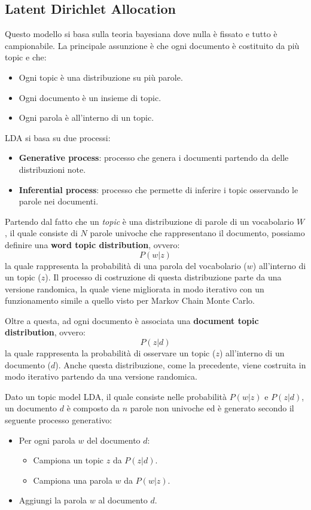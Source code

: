 \subsection{Latent Dirichlet Allocation}
Questo modello si basa sulla teoria bayesiana dove nulla è fissato e tutto è
campionabile. La principale assunzione è che ogni documento è costituito da più
topic e che:
\begin{itemize}
      \item Ogni topic è una distribuzione su più parole.
      \item Ogni documento è un insieme di topic.
      \item Ogni parola è all'interno di un topic.
\end{itemize}
LDA si basa su due processi:
\begin{itemize}
      \item \textbf{Generative process}: processo che genera i documenti partendo
            da delle distribuzioni note.
      \item \textbf{Inferential process}: processo che permette di inferire i topic
            osservando le parole nei documenti.
\end{itemize}
Partendo dal fatto che un \textit{topic} è una distribuzione di parole di un
vocabolario $W$, il quale consiste di $N$ parole univoche che rappresentano il
documento, possiamo definire una \textbf{word topic distribution}, ovvero:
\begin{equation}
      P(w|z)
\end{equation}
la quale rappresenta la probabilità di una parola del vocabolario ($w$) all'interno
di un topic ($z$). Il processo di costruzione di questa distribuzione parte da
una versione randomica, la quale viene migliorata in modo iterativo con un
funzionamento simile a quello visto per Markov Chain Monte Carlo.

Oltre a questa, ad ogni documento è associata una \textbf{document topic distribution},
ovvero:
\begin{equation}
      P(z|d)
\end{equation}
la quale rappresenta la probabilità di osservare un topic ($z$) all'interno di
un documento ($d$). Anche questa distribuzione, come la precedente, viene costruita
in modo iterativo partendo da una versione randomica.

Dato un topic model LDA, il quale consiste nelle probabilità $P(w|z)$ e $P(z|d)$,
un documento $d$ è composto da $n$ parole non univoche ed è generato secondo il
seguente processo generativo:
\begin{itemize}
      \item Per ogni parola $w$ del documento $d$:
            \begin{itemize}
                  \item Campiona un topic $z$ da $P(z|d)$.
                  \item Campiona una parola $w$ da $P(w|z)$.
            \end{itemize}
      \item Aggiungi la parola $w$ al documento $d$.
\end{itemize}

